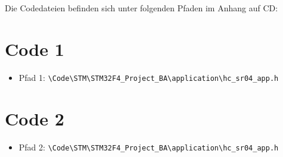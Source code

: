 Die Codedateien befinden sich unter folgenden Pfaden im Anhang auf CD:

\section{Code 1}
\begin{itemize}
\item Pfad 1: \lstinline{\Code\STM\STM32F4_Project_BA\application\hc_sr04_app.h}
\end{itemize}

\section{Code 2}
\begin{itemize}
\item Pfad 2: \lstinline{\Code\STM\STM32F4_Project_BA\application\hc_sr04_app.h}
\end{itemize}